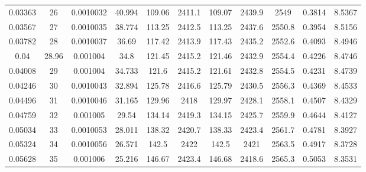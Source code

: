 \begin{longtable}{ccccccccccc}
0.03363  & 26          & 0.0010032              & 40.994              & 109.06                 & 2411.1              & 109.07          & 2439.9       & 2549         & 0.3814         & 8.5367      \\
0.03567  & 27          & 0.0010035              & 38.774              & 113.25                 & 2412.5              & 113.25          & 2437.6       & 2550.8       & 0.3954         & 8.5156      \\
0.03782  & 28          & 0.0010037              & 36.69               & 117.42                 & 2413.9              & 117.43          & 2435.2       & 2552.6       & 0.4093         & 8.4946      \\
0.04     & 28.96       & 0.001004               & 34.8                & 121.45                 & 2415.2              & 121.46          & 2432.9       & 2554.4       & 0.4226         & 8.4746      \\
0.04008  & 29          & 0.001004               & 34.733              & 121.6                  & 2415.2              & 121.61          & 2432.8       & 2554.5       & 0.4231         & 8.4739      \\
0.04246  & 30          & 0.0010043              & 32.894              & 125.78                 & 2416.6              & 125.79          & 2430.5       & 2556.3       & 0.4369         & 8.4533      \\
0.04496  & 31          & 0.0010046              & 31.165              & 129.96                 & 2418                & 129.97          & 2428.1       & 2558.1       & 0.4507         & 8.4329      \\
0.04759  & 32          & 0.001005               & 29.54               & 134.14                 & 2419.3              & 134.15          & 2425.7       & 2559.9       & 0.4644         & 8.4127      \\
0.05034  & 33          & 0.0010053              & 28.011              & 138.32                 & 2420.7              & 138.33          & 2423.4       & 2561.7       & 0.4781         & 8.3927      \\
0.05324  & 34          & 0.0010056              & 26.571              & 142.5                  & 2422                & 142.5           & 2421         & 2563.5       & 0.4917         & 8.3728      \\
0.05628  & 35          & 0.001006               & 25.216              & 146.67                 & 2423.4              & 146.68          & 2418.6       & 2565.3       & 0.5053         & 8.3531      \\

\end{longtable}
